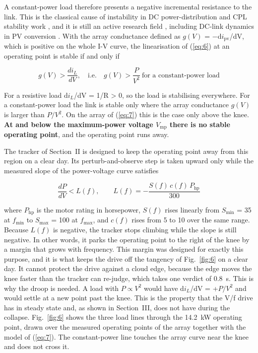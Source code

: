 \documentclass[journal]{IEEEtran}
\begin{document}
A constant-power load therefore presents a negative incremental resistance to the link. This is the classical cause of instability in DC power-distribution and CPL stability work \cite{r12,r13,r14,r15}, and it is still an active research field \cite{r16,r17,r18,r19,r22}, including DC-link dynamics in PV conversion \cite{r21}. With the array conductance defined as $g(V)$ = $-$d$i_{\mathrm{pv}}$/dV, which is positive on the whole I-V curve, the linearisation of (\ref{eq:6}) at an operating point is stable if and only if \cite{r12,r15,r26}

\begin{equation}
g(V) > \frac{di_L}{dV},\quad \text{i.e.}\quad g(V) > \frac{P}{V^{2}}\ \text{for a constant-power load}
\label{eq:11}
\end{equation}

For a resistive load d$i_L$/dV = 1/R > 0, so the load is stabilising everywhere. For a constant-power load the link is stable only where the array conductance $g(V)$ is larger than $P/V^{2}$. On the array of (\ref{eq:7}) this is the case only above the knee. \textbf{At and below the maximum-power voltage $V_{\mathrm{mp}}$ there is no stable operating point}, and the operating point runs away.

The tracker of Section~II is designed to keep the operating point away from this region on a clear day. Its perturb-and-observe step is taken upward only while the measured slope of the power-voltage curve satisfies

\begin{equation}
\frac{dP}{dV} < L(f),\qquad L(f) = -\frac{S(f)\,c(f)\,P_{\mathrm{hp}}}{300}
\label{eq:12}
\end{equation}

where $P_{\mathrm{hp}}$ is the motor rating in horsepower, $S(f)$ rises linearly from $S_{\min}$ = 35 at $f_{\min}$ to $S_{\max}$ = 100 at $f_{\max}$, and $c(f)$ rises from 5 to 10 over the same range. Because $L(f)$ is negative, the tracker stops climbing while the slope is still negative. In other words, it parks the operating point to the right of the knee by a margin that grows with frequency. This margin was designed for exactly this purpose, and it is what keeps the drive off the tangency of Fig.~\ref{fig:6} on a clear day. It cannot protect the drive against a cloud edge, because the edge moves the knee faster than the tracker can re-judge, which takes one verdict of 0.8~s. This is why the droop is needed. A load with $P \propto V^{2}$ would have d$i_L$/dV = +$P/V^{2}$ and would settle at a new point past the knee. This is the property that the V/f drive has in steady state and, as shown in Section~III, does not have during the collapse. Fig.~\ref{fig:6} shows the three load lines through the 14.2~kW operating point, drawn over the measured operating points of the array together with the model of (\ref{eq:7}). The constant-power line touches the array curve near the knee and does not cross it.
\end{document}
